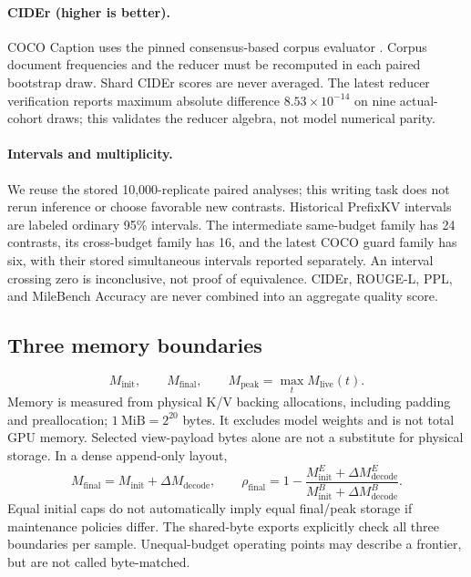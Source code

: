 \documentclass[10pt,letterpaper]{article}
\begin{document}
\paragraph{CIDEr (higher is better).}
COCO Caption uses the pinned consensus-based corpus evaluator
\citep{lin2014coco,vedantam2015cider}. Corpus document frequencies and
the reducer must be recomputed in each paired bootstrap draw. Shard CIDEr
scores are never averaged. The latest reducer verification reports maximum
absolute difference $8.53\times10^{-14}$ on nine actual-cohort draws;
this validates the reducer algebra, not model numerical parity.

\paragraph{Intervals and multiplicity.}
We reuse the stored 10,000-replicate paired analyses; this writing task
does not rerun inference or choose favorable new contrasts. Historical
PrefixKV intervals are labeled ordinary 95\% intervals. The intermediate
same-budget family has 24 contrasts, its cross-budget family has 16, and
the latest COCO guard family has six, with their stored simultaneous
intervals reported separately. An interval crossing zero is inconclusive,
not proof of equivalence. CIDEr, ROUGE-L, PPL, and MileBench Accuracy are
never combined into an aggregate quality score.

\subsection{Three memory boundaries}
\begin{equation}
M_{\mathrm{init}},\qquad M_{\mathrm{final}},\qquad
M_{\mathrm{peak}}=\max_t M_{\mathrm{live}}(t).
\end{equation}
Memory is measured from physical K/V backing allocations, including padding
and preallocation; $1~\mathrm{MiB}=2^{20}$ bytes. It excludes model weights
and is not total GPU memory. Selected view-payload bytes alone are not a
substitute for physical storage. In a dense append-only layout,
\begin{equation}
M_{\mathrm{final}}=M_{\mathrm{init}}+\Delta M_{\mathrm{decode}},\qquad
\rho_{\mathrm{final}}=1-
\frac{M^{E}_{\mathrm{init}}+\Delta M^{E}_{\mathrm{decode}}}
{M^{B}_{\mathrm{init}}+\Delta M^{B}_{\mathrm{decode}}}.
\end{equation}
Equal initial caps do not automatically imply equal final/peak storage if
maintenance policies differ. The shared-byte exports explicitly check all
three boundaries per sample. Unequal-budget operating points may describe
a frontier, but are not called byte-matched.
\end{document}
